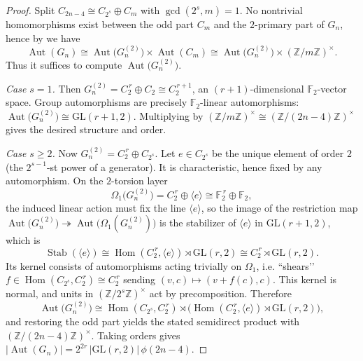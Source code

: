 \documentclass[11pt]{amsart}
\newcommand{\F}{\mathbb{F}}
\newcommand{\Z}{\mathbb{Z}}
\theoremstyle{plain}
\theoremstyle{definition}
\theoremstyle{remark}
\begin{document}
\begin{proof}
Split $C_{2n-4}\cong C_{2^{s}}\oplus C_m$ with $\gcd(2^{s},m)=1$.
No nontrivial homomorphisms exist between the odd part $C_m$ and the $2$-primary part of $G_n$, hence by \citep[Lemma~2.1]{Hillar-Rhea} we have
\[
\operatorname{Aut}(G_n)\cong \operatorname{Aut}\big(G_n^{(2)}\big)\times \operatorname{Aut}(C_m)\cong \operatorname{Aut}\big(G_n^{(2)}\big)\times (\Z/m\Z)^\times.
\]
Thus it suffices to compute $\operatorname{Aut}\big(G_n^{(2)}\big)$.

\smallskip
\emph{Case $s=1$.}
Then $G_n^{(2)}=C_2^{\,r}\oplus C_2\cong C_2^{\,r+1}$, an $(r\!+\!1)$-dimensional $\F_2$-vector space.
Group automorphisms are precisely $\F_2$-linear automorphisms:
$\operatorname{Aut}\big(G_n^{(2)}\big)\cong \mathrm{GL}(r\!+\!1,2)$.
Multiplying by $(\Z/m\Z)^\times\cong (\Z/(2n-4)\Z)^\times$ gives the desired structure and order.

\smallskip
\emph{Case $s\ge2$.}
Now $G_n^{(2)}=C_2^{\,r}\oplus C_{2^{s}}$.
Let $e\in C_{2^{s}}$ be the unique element of order $2$ (the $2^{s-1}$-st power of a generator).
It is characteristic, hence fixed by any automorphism.
On the $2$-torsion layer
\[
\Omega_1\big(G_n^{(2)}\big)=C_2^{\,r}\oplus \langle e\rangle\cong \F_2^{\,r}\oplus \F_2,
\]
the induced linear action must fix the line $\langle e\rangle$, so the image of the restriction map
$\operatorname{Aut}\big(G_n^{(2)}\big)\twoheadrightarrow \operatorname{Aut}\big(\Omega_1(G_n^{(2)})\big)$
is the stabilizer of $\langle e\rangle$ in $\mathrm{GL}(r\!+\!1,2)$, which is
\[
\operatorname{Stab}(\langle e\rangle)\cong \operatorname{Hom}(C_2^{\,r},\langle e\rangle)\rtimes \mathrm{GL}(r,2)\cong C_2^{\,r}\rtimes \mathrm{GL}(r,2).
\]
Its kernel consists of automorphisms acting trivially on $\Omega_1$, i.e. “shears’’
$f\in\operatorname{Hom}(C_{2^{s}},C_2^{\,r})\cong C_2^{\,r}$ sending $(v,c)\mapsto (v+f(c),c)$.
This kernel is normal, and units in $(\Z/2^{s}\Z)^\times$ act by precomposition.
Therefore
\[
\operatorname{Aut}\big(G_n^{(2)}\big)\cong
\operatorname{Hom}(C_{2^{s}},C_2^{\,r})\rtimes\big(\operatorname{Hom}(C_2^{\,r},\langle e\rangle)\rtimes \mathrm{GL}(r,2)\big),
\]
and restoring the odd part yields the stated semidirect product with $(\Z/(2n-4)\Z)^\times$.
Taking orders gives $|\operatorname{Aut}(G_n)|=2^{2r}\,|\mathrm{GL}(r,2)|\,\phi(2n-4)$.
\end{proof}
\end{document}
